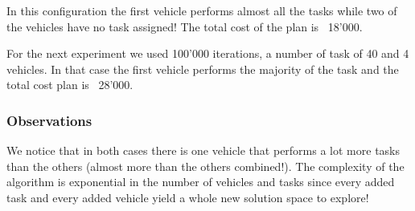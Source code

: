 \documentclass[11pt]{article}
\begin{document}
In this configuration the first vehicle performs almost all the
tasks while two of the vehicles have no task assigned! The total cost
of the plan is ~18'000.

For the next experiment we used 100'000 iterations, a number of task of
40 and 4 vehicles. In that case the first vehicle performs the
majority of the task and the total cost plan is ~28'000.

\subsubsection{Observations}

We notice that in both cases there is one vehicle that performs a lot
more tasks than the others (almost more than the others
combined!). The complexity  of the algorithm is exponential in the
number of vehicles and tasks since every added task and every added
vehicle yield a whole new solution space to explore!
\end{document}
